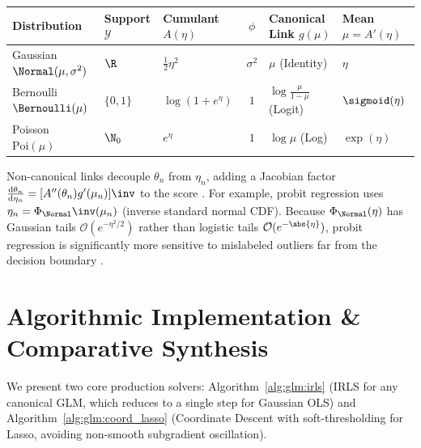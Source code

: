 \documentclass[../../../../master.tex]{subfiles}
\begin{document}
\begin{center}
\small
\setlength{\tabcolsep}{4pt}
\begin{tabularx}{\textwidth}{@{}l l l c l X@{}}
\toprule
\textbf{Distribution} & \textbf{Support $\mathcal{Y}$} & \textbf{Cumulant $A(\eta)$} & \textbf{$\phi$} & \textbf{Canonical Link $g(\mu)$} & \textbf{Mean $\mu = A'(\eta)$} \\
\midrule
Gaussian $\Normal(\mu,\sigma^2)$ & $\R$ & $\frac{1}{2}\eta^2$ & $\sigma^2$ & $\mu$ (Identity) & $\eta$ \\
Bernoulli $\Bernoulli(\mu)$ & $\{0,1\}$ & $\log(1+e^\eta)$ & $1$ & $\log\frac{\mu}{1-\mu}$ (Logit) & $\sigmoid(\eta)$ \\
Poisson $\mathrm{Poi}(\mu)$ & $\N_0$ & $e^\eta$ & $1$ & $\log\mu$ (Log) & $\exp(\eta)$ \\
\bottomrule
\end{tabularx}
\label{tab:glm:canonical_table}
\end{center}

Non-canonical links decouple $\theta_n$ from $\eta_n$, adding a Jacobian factor $\frac{\mathrm{d}\theta_n}{\mathrm{d}\eta_n} = [A''(\theta_n) g'(\mu_n)]\inv$ to the score . For example, probit regression uses $\eta_n = \Phi_{\Normal}\inv(\mu_n)$ (inverse standard normal CDF). Because $\Phi_{\Normal}(\eta)$ has Gaussian tails $\mathcal{O}(e^{-\eta^2/2})$ rather than logistic tails $\mathcal{O}(e^{-\abs{\eta}})$, probit regression is significantly more sensitive to mislabeled outliers far from the decision boundary .

\section{Algorithmic Implementation \& Comparative Synthesis}
\label{sec:glm:algorithms}

We present two core production solvers: Algorithm~\ref{alg:glm:irls} (IRLS for any canonical GLM, which reduces to a single step for Gaussian OLS) and Algorithm~\ref{alg:glm:coord_lasso} (Coordinate Descent with soft-thresholding for Lasso, avoiding non-smooth subgradient oscillation).
\end{document}
